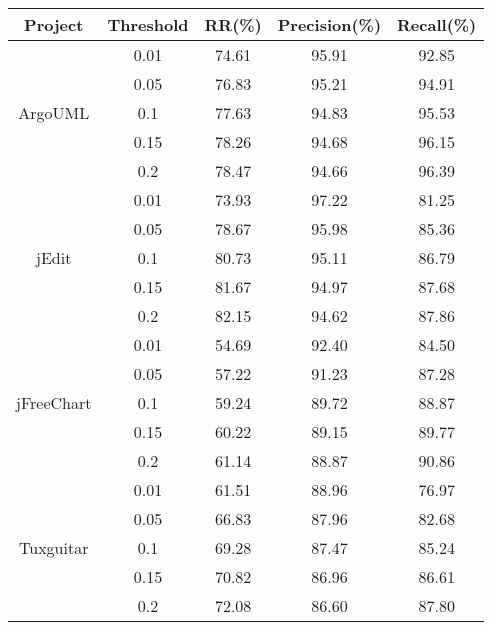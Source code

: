 \begin{table}[htbp]
\vspace{0.5em}\centering\wuhao
\begin{tabular}{ccccc}
\toprule[1.5pt]
\textbf{Project}&\textbf{Threshold}&\textbf{RR(\%)}&\textbf{Precision(\%)}&\textbf{Recall(\%)}\\
\midrule[1pt]
\multirow{5}{*}{ArgoUML}
&0.01&	74.61&	95.91&	92.85\\
&0.05&	76.83&	95.21&	94.91\\
&0.1&	77.63&	94.83&	95.53\\
&0.15&  78.26&	94.68&	96.15\\
&0.2&	78.47&	94.66&	96.39\\
\multirow{5}{*}{jEdit}
&0.01&	73.93&	97.22&	81.25\\
&0.05&	78.67&	95.98&	85.36	\\
&0.1&	80.73&	95.11&	86.79	\\
&0.15&	81.67&	94.97&	87.68	\\
&0.2&	82.15&	94.62&	87.86	\\
\multirow{5}{*}{jFreeChart}
&0.01&	54.69&	92.40&	84.50\\
&0.05&	57.22&	91.23&	87.28\\
&0.1&	59.24&	89.72&	88.87\\
&0.15&	60.22&	89.15&	89.77\\
&0.2&	61.14&	88.87&	90.86\\
\multirow{5}{*}{Tuxguitar}
&0.01&	61.51&	88.96&	76.97\\
&0.05&	66.83&	87.96&	82.68\\
&0.1&	69.28&	87.47&	85.24\\
&0.15&	70.82&	86.96&	86.61\\
&0.2&	72.08&	86.60&	87.80\\
\bottomrule[1.5pt]
\end{tabular}
\end{table}

